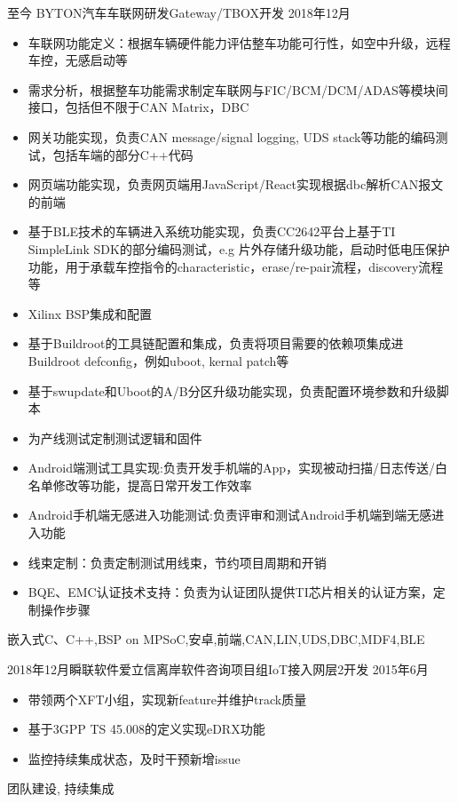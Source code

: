 %
%


 
\begin{experiences}
	
	\experience
	{至今} {BYTON汽车}{车联网研发}{Gateway/TBOX开发}
	{2018年12月 }    {
		\begin{itemize}
			\item 车联网功能定义：根据车辆硬件能力评估整车功能可行性，如空中升级，远程车控，无感启动等
			\item 需求分析，根据整车功能需求制定车联网与FIC/BCM/DCM/ADAS等模块间接口，包括但不限于CAN Matrix，DBC
			\item 网关功能实现，负责CAN message/signal logging, UDS stack等功能的编码测试，包括车端的部分C++代码
			\item 网页端功能实现，负责网页端用JavaScript/React实现根据dbc解析CAN报文的前端
			\item 基于BLE技术的车辆进入系统功能实现，负责CC2642平台上基于TI SimpleLink SDK的部分编码测试，e.g 片外存储升级功能，启动时低电压保护功能，用于承载车控指令的characteristic，erase/re-pair流程，discovery流程等
			\item Xilinx BSP集成和配置
			\item 基于Buildroot的工具链配置和集成，负责将项目需要的依赖项集成进Buildroot defconfig，例如uboot, kernal patch等
			\item 基于swupdate和Uboot的A/B分区升级功能实现，负责配置环境参数和升级脚本
			\item 为产线测试定制测试逻辑和固件
			\item Android端测试工具实现:负责开发手机端的App，实现被动扫描/日志传送/白名单修改等功能，提高日常开发工作效率
			\item Android手机端无感进入功能测试:负责评审和测试Android手机端到端无感进入功能
			\item 线束定制：负责定制测试用线束，节约项目周期和开销
			\item BQE、EMC认证技术支持：负责为认证团队提供TI芯片相关的认证方案，定制操作步骤
		\end{itemize}
	}
	{嵌入式C、C++,BSP on MPSoC,安卓,前端,CAN,LIN,UDS,DBC,MDF4,BLE}
	
	\emptySeparator	
	\experience
	{2018年12月}{瞬联软件}{爱立信离岸软件咨询项目组}{IoT接入网层2开发}
	{2015年6月} {
		\begin{itemize}
            \item 带领两个XFT小组，实现新feature并维护track质量
			\item 基于3GPP TS 45.008的定义实现eDRX功能
			\item 监控持续集成状态，及时干预新增issue
		\end{itemize}
	}
	{团队建设, 持续集成}
		

\end{experiences}
